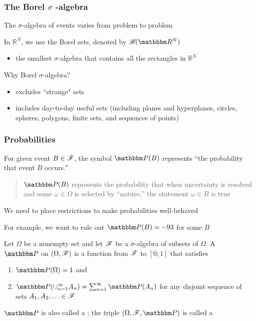 \begin{frame}\frametitle{The Borel $\sigma$ -algebra}
    
    \vspace{2em}
    The $\sigma$-algebra of events varies from problem to problem
    
    In $\mathbb{R}^{N}$, we use the Borel sets, denoted by $\bB(\RR^N)$ 
    \begin{itemize}
        \item the smallest $\sigma$-algebra that contains all the rectangles in $\mathbb{R}^{N}$ 
    \end{itemize}
    
    Why  Borel $\sigma$-algebra?
    \begin{itemize}
        \item excludes ``strange" sets 
        \item includes day-to-day useful sets (including planes and
        hyperplanes, circles, spheres, polygons, finite sets, and sequences of points)
    \end{itemize}
    
\end{frame}

\begin{frame}\frametitle{Probabilities}

    \vspace{2em}
    For given event $B\in \mathscr F$, the symbol
    $\PP(B)$ represents ``the probability that event $B$
    occurs."
    \begin{quote}
        $\PP(B)$ represents the probability that
        when uncertainty is resolved and some $\omega \in \Omega$ is selected by
        ``nature,'' the statement $\omega \in B$ is true
    \end{quote}
    
\end{frame}

\begin{frame}

    \vspace{2em}
    We need to place restrictions to make probabilities well-behaved
    
    For example, we want to rule out $\PP(B) = -93$ for some $B$
    
    \vspace{1em}
    Let $\Omega$ be a nonempty set and let $\mathscr F$ be a $\sigma$-algebra 
    of subsets of $\Omega$.  A  $\PP$ on $(\Omega, \mathscr F)$
    is a function from $\mathscr F$ to $[0,1]$ that satisfies
    \begin{enumerate}
        \label{enum:prob}
      \item $\PP(\Omega) = 1$ and
      \item $\PP(\cup_{n=1}^{\infty} A_n) = \sum_{n=1}^{\infty} \PP(A_n)$ for any
          disjoint sequence of sets $A_1, A_2, \ldots \in \mathscr F$
    \end{enumerate}
     
     $\PP$ is also called a ; 
     the triple $(\Omega, \fF, \PP)$ is called a 
    
\end{frame}

